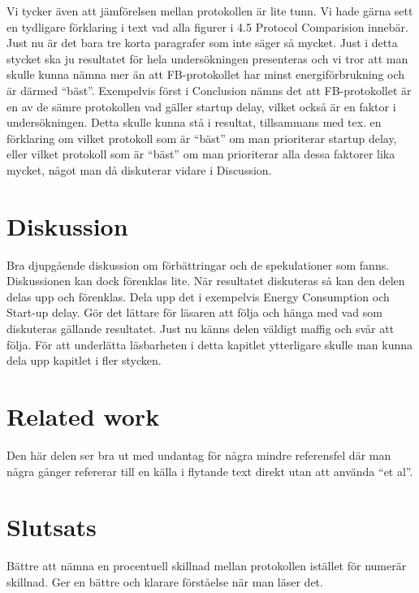 \documentclass{article}
\begin{document}
Vi tycker även att jämförelsen mellan protokollen är lite tunn. Vi hade gärna sett en tydligare förklaring i text vad alla figurer i 4.5 Protocol Comparision innebär. Just nu är det bara tre korta paragrafer som inte säger så mycket. Just i detta stycket ska ju resultatet för hela undersökningen presenteras och vi tror att man skulle kunna nämna mer än att FB-protokollet har minst energiförbrukning och är därmed “bäst”. Exempelvis först i Conclusion nämns det att FB-protokollet är en av de sämre protokollen vad gäller startup delay, vilket också är en faktor i undersökningen. Detta skulle kunna stå i resultat, tillsammans med tex. en förklaring om vilket protokoll som är “bäst” om man prioriterar startup delay, eller vilket protokoll som är “bäst” om man prioriterar alla dessa faktorer lika mycket, något man då diskuterar vidare i Discussion.


\section{Diskussion}
Bra djupgående diskussion om förbättringar och de spekulationer som fanns. Diskussionen kan dock förenklas lite. När resultatet diskuteras så kan den delen delas upp och förenklas. Dela upp det i exempelvis Energy Consumption och Start-up delay. Gör det lättare för läsaren att följa och hänga med vad som diskuteras gällande resultatet. Just nu känns delen väldigt maffig och svår att följa. För att underlätta läsbarheten i detta kapitlet ytterligare skulle man kunna dela upp kapitlet i fler stycken.

\newpage
\section{Related work}
Den här delen ser bra ut med undantag för några mindre referensfel där man några gånger refererar till en källa i flytande text direkt utan att använda “et al”.


\section{Slutsats}
Bättre att nämna en procentuell skillnad mellan protokollen istället för numerär skillnad. Ger en bättre och klarare förståelse när man läser det.
\end{document}
